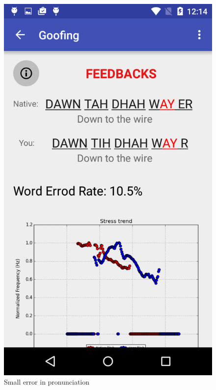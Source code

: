 \begin{figure}[!ht]
\begin{minipage}{.5\textwidth}
		\includegraphics[scale=0.18]{Figures/screenshots/error_rate2.png}
		\caption{Small error in pronunciation}
		\label{fig:error_rate2_page}
	\end{minipage}
\end{figure}

